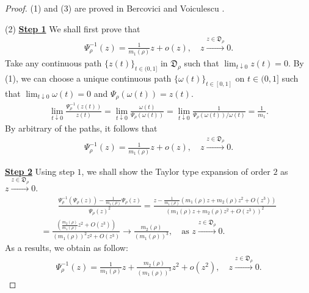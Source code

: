 \documentclass[12pt]{amsart}
\theoremstyle{definition}
\numberwithin{equation}{section}
\begin{document}
\begin{proof}
(1) and (3) are proved in Bercovici and Voiculescu \cite[Proposition 6.2]{BeVo93}.

(2) \underline{{\bf Step 1}} 
We shall first prove that
\begin{align*}
\Psi^{-1}_{\rho} (z) = \frac{1}{m_1(\rho)} z + o(z),  \quad
z \overset{z\in \mathfrak{D}_{\rho}}{\longrightarrow} 0.
\end{align*}
Take any continuous path $\{z(t)\}_{t\in (0,1]}$ 
in $\mathfrak{D}_{\rho}$ such that $\lim_{t\downarrow 0}z(t)=0$.
By (1),
we can choose a unique continuous path $\{\omega(t)\}_{t\in[0,1]}$
on $t\in (0,1]$
such that 
$\lim_{t\downarrow 0}\omega(t)=0$
and
$\Psi_{\rho}(\omega(t))=z(t)$.
\begin{align*}
\lim_{t\downarrow 0}\frac{\Psi^{-1}_{\rho}(z(t))}{z(t)} 
= \lim_{t\downarrow 0} \frac{\omega(t)}{\Psi_{\rho}(\omega(t))}
= \lim_{t\downarrow 0} \frac{1}{\Psi_{\rho}(\omega(t))/\omega(t)}
= \frac{1}{m_1}.
\end{align*}
By arbitrary of the paths, it follows that
\begin{align*}
\Psi^{-1}_{\rho} (z) = \frac{1}{m_1(\rho)} z + o(z),  \quad
z \overset{z\in \mathfrak{D}_{\rho}}{\longrightarrow} 0.
\end{align*}

\underline{{\bf Step 2}} 
Using step $1$, we shall show the Taylor type expansion of order $2$
as $z \overset{z\in \mathfrak{D}_{\rho}}{\longrightarrow} 0$.
\begin{align*}
& \quad\quad \frac{\Psi_{\rho}^{-1}(\Psi_{\rho} (z)) - \frac{1}{m_1(\rho)}\Psi_{\rho} (z)}{\Psi_{\rho} (z)^{2}}
= \frac{z-\frac{1}{m_1(\rho)}(m_1(\rho)z + m_{2}(\rho)z^{2} + O(z^{3}))}{(m_1(\rho)z + m_{2}(\rho)z^{2} + O(z^{3}))^{2}}&\\
&=\frac{\left(\frac{m_{2}(\rho)}{m_1(\rho)}z^{2} + O(z^{3})\right)}{(m_1(\rho))^{2}z^{2} + O(z^{3})}
\to \frac{m_{2}(\rho)}{(m_1(\rho))^{3}} , 
\quad \text{as }z \overset{z\in \mathfrak{D}_{\rho}}{\longrightarrow} 0. &
\end{align*}
As a results, we obtain as follow:
\begin{align*}
\Psi^{-1}_{\rho} (z) = \frac{1}{m_1(\rho)} z + \frac{m_{2}(\rho)}{(m_1(\rho))^{3}} z^{2}+o(z^{2}),  \quad
z \overset{z\in \mathfrak{D}_{\rho}}{\longrightarrow} 0.
\end{align*}
\end{proof}
\end{document}
